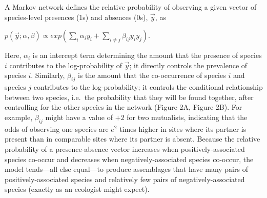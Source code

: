 A Markov network defines the relative probability of observing a given
vector of species-level presences (1s) and absences (0s), \(\vec{y}\),
as

\centering

\(p(\vec{y}; \alpha, \beta) \propto exp(\sum_{i}\alpha_i y_i + \sum_{i\neq j}\beta_{ij}y_i y_j).\)

\raggedright
\setlength{\parindent}{1cm}

Here, \(\alpha_{i}\) is an intercept term determining the amount that
the presence of species \(i\) contributes to the log-probability of
\(\vec{y}\); it directly controls the prevalence of species \(i\).
Similarly, \(\beta_{ij}\) is the amount that the co-occurrence of
species \(i\) and species \(j\) contributes to the log-probability; it
controls the conditional relationship between two species, i.e.~the
probability that they will be found together, after controlling for the
other species in the network (Figure 2A, Figure 2B). For example,
\(\beta_{ij}\) might have a value of \(+2\) for two mutualists,
indicating that the odds of observing one species are \(e^2\) times
higher in sites where its partner is present than in comparable sites
where its partner is absent. Because the relative probability of a
presence-absence vector increases when positively-associated species
co-occur and decreases when negatively-associated species co-occur, the
model tends---all else equal---to produce assemblages that have many
pairs of positively-associated species and relatively few pairs of
negatively-associated species (exactly as an ecologist might expect).

